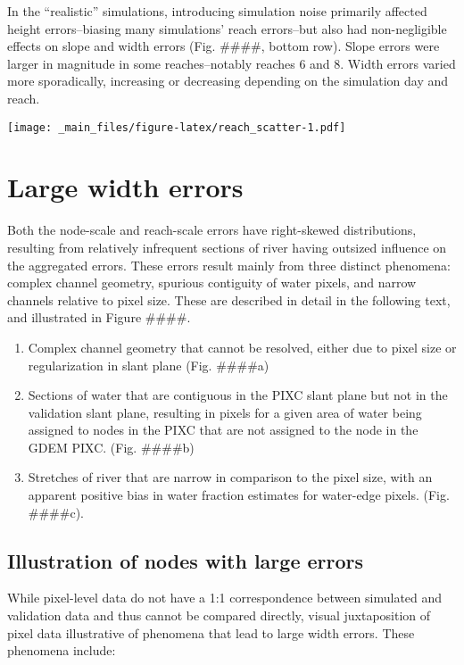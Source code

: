 \documentclass[]{book}
\providecommand{\tightlist}{%
  \setlength{\itemsep}{0pt}\setlength{\parskip}{0pt}}
\begin{document}
In the ``realistic'' simulations, introducing simulation noise primarily affected height errors--biasing many simulations' reach errors--but also had non-negligible effects on slope and width errors (Fig. \#\#\#\#, bottom row). Slope errors were larger in magnitude in some reaches--notably reaches 6 and 8. Width errors varied more sporadically, increasing or decreasing depending on the simulation day and reach.

\texttt{[image: \_main\_files/figure-latex/reach\_scatter-1.pdf]}

\hypertarget{large-width-errors}{%
\section{Large width errors}\label{large-width-errors}}

Both the node-scale and reach-scale errors have right-skewed distributions, resulting from relatively infrequent sections of river having outsized influence on the aggregated errors. These errors result mainly from three distinct phenomena: complex channel geometry, spurious contiguity of water pixels, and narrow channels relative to pixel size. These are described in detail in the following text, and illustrated in Figure \#\#\#\#.

\begin{enumerate}
\def\labelenumi{\arabic{enumi}.}
\tightlist
\item
  Complex channel geometry that cannot be resolved, either due to pixel size or regularization in slant plane (Fig. \#\#\#\#a)
\item
  Sections of water that are contiguous in the PIXC slant plane but not in the validation slant plane, resulting in pixels for a given area of water being assigned to nodes in the PIXC that are not assigned to the node in the GDEM PIXC. (Fig. \#\#\#\#b)
\item
  Stretches of river that are narrow in comparison to the pixel size, with an apparent positive bias in water fraction estimates for water-edge pixels. (Fig. \#\#\#\#c).
\end{enumerate}

\hypertarget{illustration-of-nodes-with-large-errors}{%
\subsection{Illustration of nodes with large errors}\label{illustration-of-nodes-with-large-errors}}

While pixel-level data do not have a 1:1 correspondence between simulated and validation data and thus cannot be compared directly, visual juxtaposition of pixel data illustrative of phenomena that lead to large width errors. These phenomena include:
\end{document}
